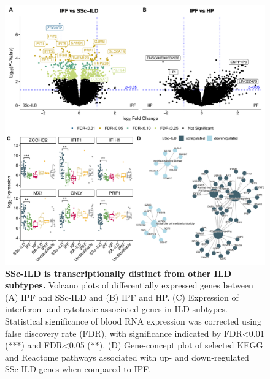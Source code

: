 \documentclass[
]{article}
\begin{document}
\begin{figure}

{\centering \includegraphics[width=1.0\linewidth,]{./Figures/BloodRNAseq/Fig1_Differential_Expression_v1} 

}

\caption[SSc-ILD transcriptome]{\textbf{SSc-ILD is transcriptionally distinct from other ILD subtypes.} Volcano plots of differentially expressed genes between (A) IPF and SSc-ILD and (B) IPF and HP. (C) Expression of interferon- and cytotoxic-associated genes in ILD subtypes. Statistical significance of blood RNA expression was corrected using false discovery rate (FDR), with significance indicated by FDR\textless0.01 (***) and FDR\textless0.05 (**). (D) Gene-concept plot of selected KEGG and Reactome pathways associated with up- and down-regulated SSc-ILD genes when compared to IPF.}\label{fig:degild}
\end{figure}
\end{document}
